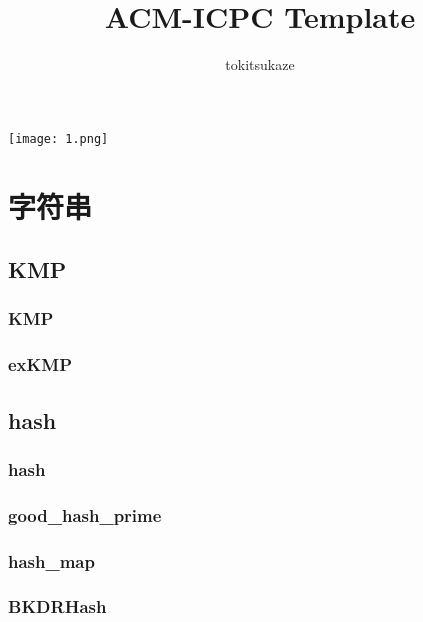 ﻿\documentclass[a4paper,twocolumn]{article}
\title{ACM-ICPC Template}
\author {tokitsukaze}
\begin{document}
\begin{titlepage}
\maketitle
\vspace*{50pt}
\begin{center}

\texttt{[image: 1.png]}
\end{center}
\end{titlepage}
\newpage
\pagestyle{empty}
\renewcommand{\contentsname}{目录}
\tableofcontents
\newpage\clearpage
\newpage
\pagestyle{fancy}
\setcounter{page}{1}

\section{字符串}
\subsection{KMP}
\subsubsection{KMP}

\subsubsection{exKMP}

\subsection{hash}
\subsubsection{hash}

\subsubsection{good\_hash\_prime}

\subsubsection{hash\_map}

\subsubsection{BKDRHash}

\end{document}
